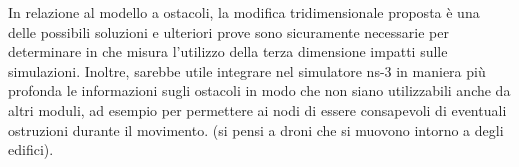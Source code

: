 In relazione al modello a ostacoli, la modifica tridimensionale proposta è una delle
possibili soluzioni e ulteriori prove sono sicuramente necessarie per determinare
in che misura l'utilizzo della terza dimensione impatti sulle simulazioni.
Inoltre, sarebbe utile integrare nel simulatore ns-3 in maniera più profonda le informazioni sugli ostacoli
in modo che non siano utilizzabili anche da altri moduli,
ad esempio per permettere ai nodi di essere consapevoli di eventuali ostruzioni durante il movimento.
(si pensi a droni che si muovono intorno a degli edifici).
